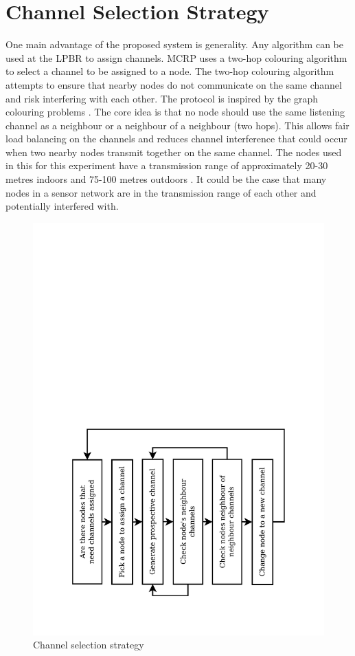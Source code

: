 \section{Channel Selection Strategy}

One main advantage of the proposed system is generality. Any algorithm can be used at the LPBR to assign channels. MCRP uses a two-hop colouring algorithm to select a channel to be assigned to a node.
The two-hop colouring algorithm attempts to ensure that nearby nodes do not communicate on the same channel and risk interfering with each other. The protocol is inspired by the graph colouring problems \cite{graphColouring}. The core idea is that no node should use the same listening channel as a neighbour or a neighbour of a neighbour (two hops).
This allows fair load balancing on the channels and reduces channel interference that could occur when two nearby nodes transmit together on the same channel. The nodes used in this for this experiment have a transmission range of approximately 20-30 metres indoors and 75-100 metres outdoors \cite{telosb-datasheet}. It could be the case that many nodes in a sensor network are in the transmission range of each other and potentially interfered with.

\begin{figure}
\centering
\includegraphics[trim=2cm 2cm 2cm 14cm, clip=true, totalheight=0.35\textheight, angle=270]{channelSelectionModified.pdf}
\caption{Channel selection strategy}
\label{fig_channelSelection}
\end{figure}
 
